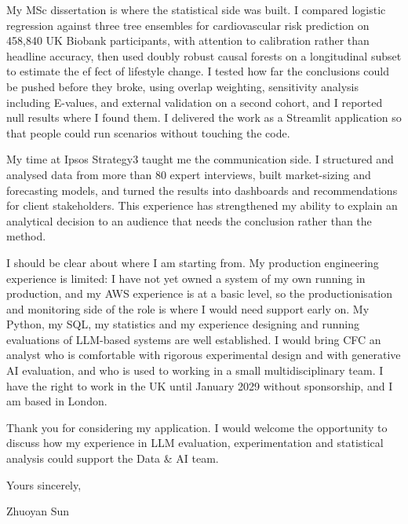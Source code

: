 \documentclass[letterpaper,11pt]{article}
\begin{document}
My MSc dissertation is where the statistical side was built. I compared logistic regression against three tree ensembles for cardiovascular risk prediction on 458,840 UK Biobank participants, with attention to calibration rather than headline accuracy, then used doubly robust causal forests on a longitudinal subset to estimate the ef\kern0pt fect of lifestyle change. I tested how far the conclusions could be pushed before they broke, using overlap weighting, sensitivity analysis including E-values, and external validation on a second cohort, and I reported null results where I found them. I delivered the work as a Streamlit application so that people could run scenarios without touching the code.

My time at Ipsos Strategy3 taught me the communication side. I structured and analysed data from more than 80 expert interviews, built market-sizing and forecasting models, and turned the results into dashboards and recommendations for client stakeholders. This experience has strengthened my ability to explain an analytical decision to an audience that needs the conclusion rather than the method.

I should be clear about where I am starting from. My production engineering experience is limited: I have not yet owned a system of my own running in production, and my AWS experience is at a basic level, so the productionisation and monitoring side of the role is where I would need support early on. My Python, my SQL, my statistics and my experience designing and running evaluations of LLM-based systems are well established. I would bring CFC an analyst who is comfortable with rigorous experimental design and with generative AI evaluation, and who is used to working in a small multidisciplinary team. I have the right to work in the UK until January 2029 without sponsorship, and I am based in London.

Thank you for considering my application. I would welcome the opportunity to discuss how my experience in LLM evaluation, experimentation and statistical analysis could support the Data \& AI team.

\vspace{2pt}
Yours sincerely,

\vspace{8pt}
Zhuoyan Sun
\end{document}
